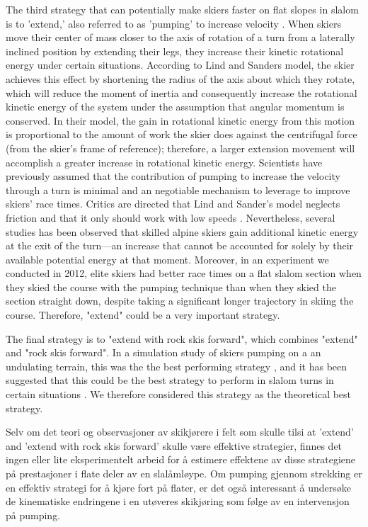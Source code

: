 The third strategy that can potentially make skiers faster on flat slopes in slalom is to 'extend,' also referred to as 'pumping' to increase velocity \cite{lind_physics_2013}. When skiers move their center of mass closer to the axis of rotation of a turn from a laterally inclined position by extending their legs, they increase their kinetic rotational energy under certain situations. According to Lind and Sanders \cite{lind_physics_2013} model, the skier achieves this effect by shortening the radius of the axis about which they rotate, which will reduce the moment of inertia and consequently increase the rotational kinetic energy of the system under the assumption that angular momentum is conserved. In their model, the gain in rotational kinetic energy from this motion is proportional to the amount of work the skier does against the centrifugal force (from the skier's frame of reference); therefore, a larger extension movement will accomplish a greater increase in rotational kinetic energy. Scientists have previously assumed that the contribution of pumping to increase the velocity through a turn is minimal and an negotiable mechanism to leverage to improve skiers' race times\cite{supej_differential_2008}. Critics are directed that Lind and Sander's model neglects friction and that it only should work with low speeds \cite{supej_differential_2008, supej_how_2010}. Nevertheless, several studies has been observed that skilled alpine skiers gain additional kinetic energy at the exit of the turn—an increase that cannot be accounted for solely by their available potential energy at that moment\cite{reid_kinematic_2010, supej_how_2010, supej_differential_2008}. Moreover, in an experiment we conducted in 2012, elite skiers had better race times on a flat slalom section when they skied the course with the pumping technique than when they skied the section straight down, despite taking a significant longer trajectory in skiing the course. Therefore, "extend" could be a very important strategy.  

The final strategy is to "extend with rock skis forward", which combines "extend" and "rock skis forward". In a simulation study of skiers pumping on a an undulating terrain, this was the the best performing strategy \cite{mote_accelerations_1983}, and it has been suggested that this could be the best strategy to perform in slalom turns in certain situations \cite{reid_kinematic_2010}. We therefore considered this strategy as the theoretical best strategy. 

Selv om det teori og observasjoner av skikjørere i felt som skulle tilsi at 'extend' and 'extend with rock skis forward' skulle være effektive strategier, finnes det ingen eller lite eksperimentelt arbeid for å estimere effektene av disse strategiene på prestasjoner i flate deler av en slalåmløype. Om pumping gjennom strekking er en effektiv strategi for å kjøre fort på flater, er det også interessant å undersøke de kinematiske endringene i en utøveres skikjøring som følge av en intervensjon på pumping. 


